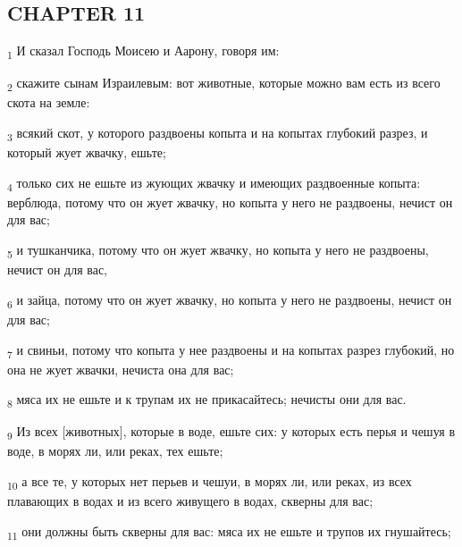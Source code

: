\subsection{CHAPTER 11}
\begin{tcolorbox}
\textsubscript{1} И сказал Господь Моисею и Аарону, говоря им:
\end{tcolorbox}
\begin{tcolorbox}
\textsubscript{2} скажите сынам Израилевым: вот животные, которые можно вам есть из всего скота на земле:
\end{tcolorbox}
\begin{tcolorbox}
\textsubscript{3} всякий скот, у которого раздвоены копыта и на копытах глубокий разрез, и который жует жвачку, ешьте;
\end{tcolorbox}
\begin{tcolorbox}
\textsubscript{4} только сих не ешьте из жующих жвачку и имеющих раздвоенные копыта: верблюда, потому что он жует жвачку, но копыта у него не раздвоены, нечист он для вас;
\end{tcolorbox}
\begin{tcolorbox}
\textsubscript{5} и тушканчика, потому что он жует жвачку, но копыта у него не раздвоены, нечист он для вас,
\end{tcolorbox}
\begin{tcolorbox}
\textsubscript{6} и зайца, потому что он жует жвачку, но копыта у него не раздвоены, нечист он для вас;
\end{tcolorbox}
\begin{tcolorbox}
\textsubscript{7} и свиньи, потому что копыта у нее раздвоены и на копытах разрез глубокий, но она не жует жвачки, нечиста она для вас;
\end{tcolorbox}
\begin{tcolorbox}
\textsubscript{8} мяса их не ешьте и к трупам их не прикасайтесь; нечисты они для вас.
\end{tcolorbox}
\begin{tcolorbox}
\textsubscript{9} Из всех [животных], которые в воде, ешьте сих: у которых есть перья и чешуя в воде, в морях ли, или реках, тех ешьте;
\end{tcolorbox}
\begin{tcolorbox}
\textsubscript{10} а все те, у которых нет перьев и чешуи, в морях ли, или реках, из всех плавающих в водах и из всего живущего в водах, скверны для вас;
\end{tcolorbox}
\begin{tcolorbox}
\textsubscript{11} они должны быть скверны для вас: мяса их не ешьте и трупов их гнушайтесь;
\end{tcolorbox}
